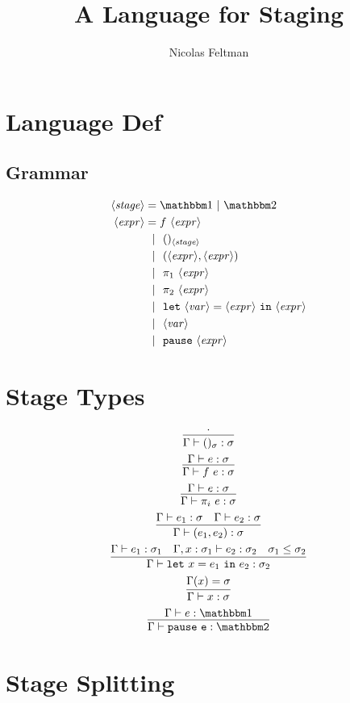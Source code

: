 \documentclass{article}
\title{\Large\textbf{A Language for Staging}}
\author{Nicolas Feltman}
\newcommand {\stage} {\langle\mathit{stage}\rangle}
\newcommand {\expr} {\langle\mathit{expr}\rangle}
\newcommand {\var} {\langle\mathit{var}\rangle}
\newcommand {\gbar} {~~|~~}
\newcommand {\bbone} {\mathbbm 1}
\newcommand {\bbtwo} {\mathbbm 2}
\newcommand {\pause} {\tt pause}
\newcommand {\letin} [3] {{\tt let}~{#1} = {#2}~{\tt in}~{#3}}
\newcommand {\inferenceSpacing}{\setlength{\jot}{3ex}}
\begin{document}
\maketitle

\section{Language Def}

\subsection{Grammar}
\begin{align*}
\stage &= \bbone~|~\bbtwo \\
\expr &= f~\expr \\
&\gbar ()_{\stage} \\
&\gbar (\expr, \expr) \\
&\gbar \pi_1~\expr \\
&\gbar \pi_2~\expr \\
&\gbar \letin {\var}{\expr}{\expr} \\
&\gbar \var \\
&\gbar \pause~\expr \\
\end{align*}

\section{Stage Types}
\inferenceSpacing
\begin{gather}
\infer {\Gamma\vdash ()_\sigma : \sigma}{\cdot} \\
\infer {\Gamma\vdash f~e : \sigma}{\Gamma\vdash e : \sigma} \\
\infer {\Gamma\vdash \pi_i~e : \sigma}{\Gamma\vdash e : \sigma} \\
\infer {\Gamma\vdash (e_1,e_2) : \sigma}{\Gamma\vdash e_1 : \sigma & \Gamma\vdash e_2 : \sigma} \\
\infer {\Gamma\vdash \letin {x}{e_1}{e_2} : \sigma_2}{\Gamma\vdash e_1 : \sigma_1 & \Gamma,x:\sigma_1\vdash e_2 : \sigma_2 & \sigma_1 \le \sigma_2} \\
\infer {\Gamma\vdash x : \sigma}{\Gamma(x) = \sigma} \\
\infer {\Gamma\vdash \pause~e : \bbtwo}{\Gamma\vdash e : \bbone}
\end{gather}

\section{Stage Splitting}
\end{document}
